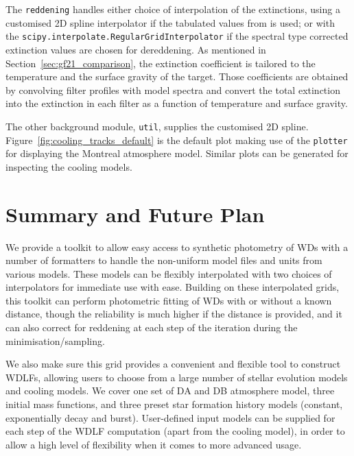 \documentclass[fleqn,usenatbib]{rasti}
\begin{document}
The \texttt{reddening} handles either choice of interpolation of the
extinctions, using a customised 2D spline interpolator if the tabulated values
from \citet{2011ApJ...737..103S} is used; or with the
\texttt{scipy.interpolate.RegularGridInterpolator} if the spectral type corrected
extinction values are chosen for dereddening. As mentioned in
Section~\ref{sec:gf21_comparison}, the extinction coefficient is tailored to the
temperature and the surface gravity of the target. Those coefficients are
obtained by convolving filter profiles with model spectra and convert the
total extinction into the extinction in each filter as a function of
temperature and surface gravity.

The other background module, \texttt{util}, supplies the customised 2D spline.
Figure~\ref{fig:cooling_tracks_default} is the default plot making use of the
\texttt{plotter} for displaying the Montreal atmosphere model. Similar
plots can be generated for inspecting the cooling models.

\section{Summary and Future Plan}
We provide a toolkit to allow easy access to synthetic photometry of WDs with
a number of formatters to handle the non-uniform model files and units from
various models. These models can be flexibly interpolated with two choices of
interpolators for immediate use with ease. Building on these interpolated
grids, this toolkit can perform photometric fitting of WDs with
or without a known distance, though the reliability is much higher if the distance is provided, and
it can also correct for reddening at each step of the iteration during the
minimisation/sampling.

We also make sure this grid provides a convenient and flexible
tool to construct WDLFs, allowing users to choose from a large number of
stellar evolution models and cooling models. We cover one set of DA and DB
atmosphere model, three initial mass functions, and three preset star formation
history models (constant, exponentially decay and burst). User-defined input
models can be supplied for each step of the WDLF computation (apart from
the cooling model), in order to allow a high level of flexibility when it
comes to more advanced usage.
\end{document}

